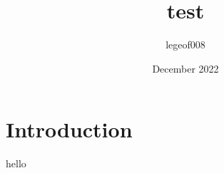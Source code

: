 \documentclass{article}
\title{test}
\author{legeof008 }
\date{December 2022}
\begin{document}
\maketitle

\section{Introduction}
hello
\end{document}
